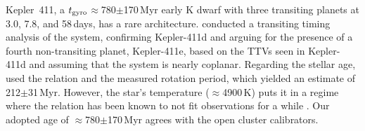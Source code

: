 \documentclass[11pt,twocolumn,tighten]{aastex63}
\begin{document}
Kepler~411, a $t_{\rm gyro}$$\approx$780$\pm$170\,Myr early K dwarf with three
transiting planets at 3.0, 7.8, and 58\,days, has a rare
architecture.  \citet{2019A&A...624A..15S} conducted a transiting
timing analysis of the system, confirming Kepler-411d and arguing for
the presence of a fourth non-transiting planet, Kepler-411e, based on
the TTVs seen in Kepler-411d and assuming that the system is nearly
coplanar.  Regarding the stellar age, \citet{2019A&A...624A..15S} used
the \citet{2007ApJ...669.1167B} relation and the measured rotation
period, which yielded an estimate of 212$\pm$31\,Myr.  However, the
star's temperature ($\approx$4900\,K) puts it in a regime where the
\citeauthor{2007ApJ...669.1167B} relation has been known to not fit
observations for a while
\citep[e.g.][Fig.~9]{Mamajek_2008}.  Our adopted age of
$\approx$780$\pm$170\,Myr agrees with the open cluster calibrators.

%


%
%
%
\end{document}
